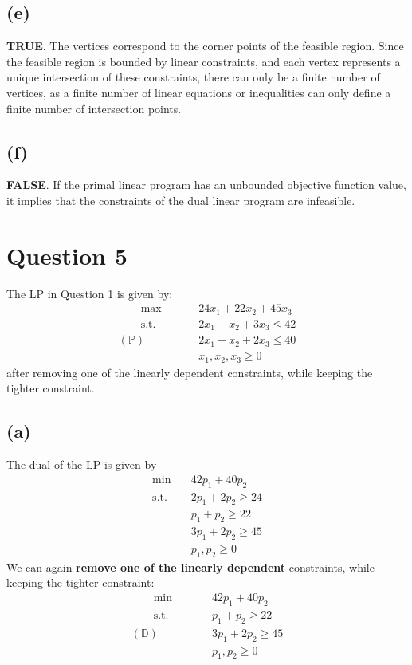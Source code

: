 \documentclass[12pt]{article}
\begin{document}
\subsection*{(e)}
\textbf{TRUE}. The vertices correspond to the corner points of the feasible region. Since the feasible region is bounded by linear constraints, and each vertex represents a unique intersection of these constraints, there can only be a finite number of vertices, as a finite number of linear equations or inequalities can only define a finite number of intersection points.

\subsection*{(f)}
\textbf{FALSE}. If the primal linear program has an unbounded objective function value, it implies that the constraints of the dual linear program are infeasible. 

\newpage

\section*{Question 5}
The LP in Question 1 is given by: \begin{align*}
    \qquad \max \quad & 24 x_{1} + 22 x_{2} + 45 x_{3} \\ 
    \qquad \text{s.t.} \quad & 2 x_{1} + x_{2} + 3 x_{3} \leq 42 \\ 
    (\mathbb{P}) \qquad \qquad & 2 x_{1} + x_{2} + 2 x_{3} \leq 40 \\ 
    \qquad & x_{1}, x_{2}, x_{3} \geq 0
\end{align*} after removing one of the linearly dependent constraints, while keeping the tighter constraint. 

\subsection*{(a)}

The dual of the LP is given by \begin{align*}
    \min \quad & 42 p_{1} + 40 p_{2} \\ 
    \text{s.t.} \quad & 2 p_{1} + 2 p_{2} \geq 24 \\ 
    & p_{1} + p_{2} \geq 22 \\ 
    & 3 p_{1} + 2 p_{2} \geq 45 \\ 
    & p_{1}, p_{2} \geq 0
\end{align*} We can again \textbf{remove one of the linearly dependent} constraints, while keeping the tighter constraint: \begin{align*}
    \qquad \min \quad & 42 p_{1} + 40 p_{2} \\ 
    \qquad \text{s.t.} \quad & p_{1} + p_{2} \geq 22 \\ 
    (\mathbb{D})\qquad \qquad & 3 p_{1} + 2 p_{2} \geq 45 \\ 
    \qquad & p_{1}, p_{2} \geq 0
\end{align*}
\end{document}
